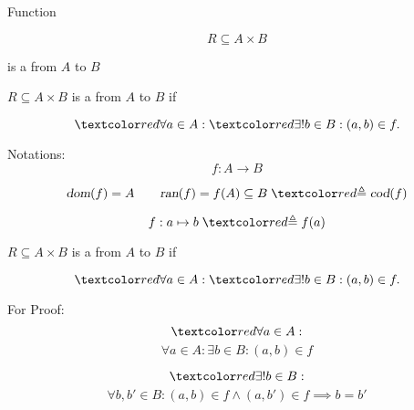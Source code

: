 
\begin{frame}{}
  \begin{center}
    {\LARGE Function}

    \pause

    \pause
    \vspace{0.20cm}
    \centerline{\Large {}}
  \end{center}
\end{frame}

\begin{frame}{}
  \begin{center}
  \end{center}
\end{frame}

\begin{frame}{}
  \[
    R \subseteq A \times B
  \]

  \begin{center}
    is a  from $A$ to $B$
  \end{center}
\end{frame}

\begin{frame}{}
  \begin{definition}[Function]
    $R \subseteq A \times B$ is a  from $A$ to $B$ if

    \[
      \red{\forall} a \in A: \red{\exists!} b \in B: (a, b) \in f.
    \]
  \end{definition}

  \pause
  \vspace{0.60cm}
  \begin{exampleblock}{Notations:}
    \[
      f: A \to B 
    \]

    \pause
    \[
      \dom{f} = A \qquad \ran{f} = f(A) \subseteq B \;\red{\triangleq}\; \cod{f}
    \]

    \pause
    \[
      f: a \mapsto b \;\red{\triangleq}\; f(a)
    \]
  \end{exampleblock}
\end{frame}

\begin{frame}{}
  \begin{definition}[Function]
    $R \subseteq A \times B$ is a  from $A$ to $B$ if

    \[
      \red{\forall} a \in A: \red{\exists!} b \in B: (a, b) \in f.
    \]
  \end{definition}

  \begin{alertblock}{For Proof:}
    \[
      \red{\forall a \in A:}
    \]
    \[
      \forall a \in A: \exists b \in B: (a, b) \in f
    \]

    \pause
    \[
      \red{\exists! b \in B:}
    \]
    \[
      \forall b, b' \in B: (a, b) \in f \land (a, b') \in f \implies b = b'
    \]
  \end{alertblock}
\end{frame}

